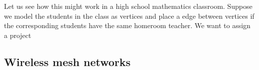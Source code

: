 Let us see how this might work in a high school mathematics classroom.  Suppose we model the students in the class as vertices and place a edge between vertices if the corresponding students have the same homeroom teacher.  We want to assign a project 
	\subsection{Wireless mesh networks}

